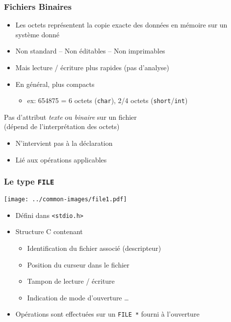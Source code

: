 \documentclass[table,handout,tikz,12pt,svgnames]{beamer}
\begin{document}
\begin{frame}[fragile=singleslide]
	\frametitle{Fichiers Binaires}
	\vspace{-0.75cm}
		\begin{itemize}
			\item Les octets représentent la copie exacte des données en mémoire sur un système donné
			\item Non standard -- Non éditables -- Non imprimables
			\item Mais lecture / écriture plus rapides (pas d'analyse)
			\item En général, plus compacts
			\begin{itemize}
				\item \small ex: 654875 = 6 octets (\texttt{char}), 2/4 octets (\texttt{short}/\texttt{int})
			\end{itemize}
		\end{itemize}
	\begin{block}{Pas d'attribut \textit{texte} ou \textit{binaire} sur un fichier \\(\small dépend de l'interprétation des octets)}
		\begin{itemize}
			\item N'intervient pas à la déclaration
			\item Lié aux opérations applicables
		\end{itemize}
	\end{block}
\end{frame}


\begin{frame}[fragile=singleslide]
	\frametitle{Le type \texttt{FILE}}
	\begin{block}{}
		{\texttt{[image: ../common-images/file1.pdf]}}		
		\begin{itemize}
			\item Défini dans \texttt{<stdio.h>}
			\item Structure C contenant
			\begin{itemize}
				\item Identification du fichier associé (descripteur)
				\item Position du curseur dans le fichier
				\item Tampon de lecture / écriture
				\item Indication de mode d'ouverture \ldots
			\end{itemize}
			\item Opérations sont effectuées sur un \texttt{FILE *} fourni à l'ouverture
		\end{itemize}
	\end{block}
\end{frame}
\end{document}
